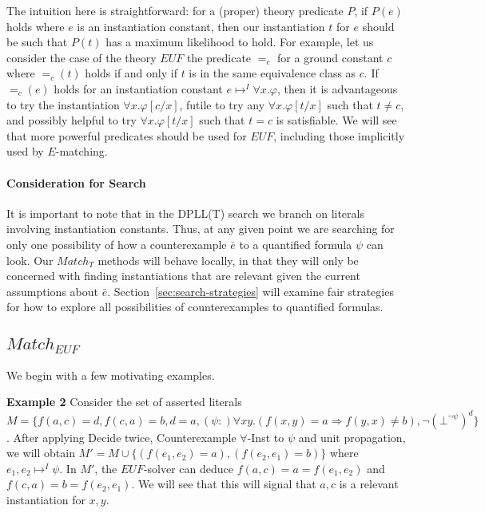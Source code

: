 \documentclass{llncs}
\begin{document}
The intuition here is straightforward: for a (proper) theory predicate $P$, if $P(e)$ holds where $e$ is an instantiation constant, then our instantiation $t$ for $e$ should be such that $P( t )$ has a maximum likelihood to hold.
For example, let us consider the case of the theory $EUF$ the predicate $=_c$ for a ground constant $c$ where $=_c( t )$ holds if and only if $t$ is in the same equivalence class as $c$.
If $=_c( e )$ holds for an instantiation constant $e \mapsto^I \forall x. \varphi$, then it is advantageous to try the instantiation $\forall x. \varphi[c/x]$, futile to try any $\forall x. \varphi[t/x]$ such that $t \neq c$, and possibly helpful to try $\forall x. \varphi[t/x]$ such that $t = c$ is satisfiable.
We will see that more powerful predicates should be used for $EUF$, including those implicitly used by $E$-matching.

\paragraph{Consideration for Search}
It is important to note that in the DPLL(T) search we branch on literals involving instantiation constants.
Thus, at any given point we are searching for only one possibility of how a counterexample $\bar{e}$ to a quantified formula $\psi$ can look.
Our $Match_T$ methods will behave locally, in that they will only be concerned with finding instantiations that are relevant given the current assumptions about $\bar{e}$.
Section~\ref{sec:search-strategies} will examine fair strategies for how to explore all possibilities of counterexamples to quantified formulas.

\subsection{$Match_{EUF}$}

We begin with a few motivating examples.

{\bf Example 2}
Consider the set of asserted literals $M = \{ f( a, c ) = d, f( c, a ) = b, d = a, (\psi :) \forall xy. (f( x, y ) = a \Rightarrow f( y, x ) \neq b), \neg ( \bot^{\neg \psi} )^d \}$.
After applying Decide twice, Counterexample $\forall$-Inst to $\psi$ and unit propagation, we will obtain $M' = M \cup \{ (f( e_1, e_2 ) = a), (f( e_2, e_1 ) = b) \}$ where $e_1, e_2 \mapsto^I \psi$.
In $M'$, the $EUF$-solver can deduce $f( a, c ) = a = f( e_1, e_2 )$ and $f( c, a ) = b = f( e_2, e_1 )$.
We will see that this will signal that $a, c$ is a relevant instantiation for $x, y$. \\
\end{document}
